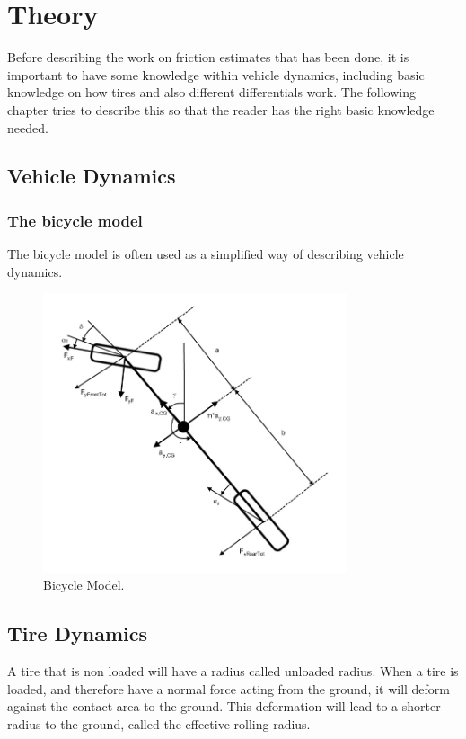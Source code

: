 \chapter{Theory}

Before describing the work on friction estimates that has been done, it is important to have some knowledge within vehicle dynamics, including basic knowledge on how tires and also different differentials work. The following chapter tries to describe this so that the reader has the right basic knowledge needed.

\section{Vehicle Dynamics}

\subsection{The bicycle model}
The bicycle model is often used as a simplified way of describing vehicle dynamics.

\begin{figure}[h]
	\centering
	\includegraphics[width=0.8\textwidth]{Pictures/bicycle_model}
	\caption {Bicycle Model. \cite{fordonsdynamik99}}
	\label{bicycle_model}
\end{figure}

\section{Tire Dynamics}

A tire that is non loaded will have a radius called unloaded radius. When a tire is loaded, and therefore have a normal force acting from the ground, it will deform against the contact area to the ground. This deformation will lead to a shorter radius to the ground, called the effective rolling radius. 

